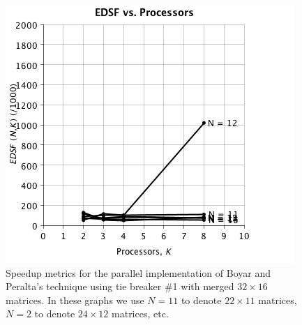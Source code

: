 \begin{figure}
\begin{center}
\includegraphics[scale=0.35]{./chapter_optimize/t1m_2.png}
\caption{Speedup metrics for the parallel implementation of Boyar and Peralta's technique using tie breaker \#1 with merged $32 \times 16$ matrices. In these graphs we use $N = 11$ to denote $22 \times 11$ matrices, $N = 2$ to denote $24 \times 12$ matrices, etc.}
\label{fig:speedup2}
\end{center}
\end{figure}


